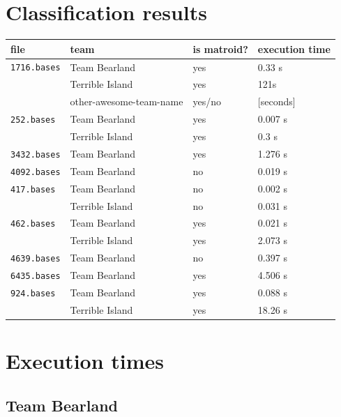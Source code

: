 \documentclass[11pt]{amsart}
\begin{document}
\section{Classification results}

\begin{center}
  \begin{tabular}[c]{llll}
    file
    & team
    & is matroid?
    & execution time
    \\\hline
    \texttt{1716.bases}
    & Team Bearland
    & yes
    & 0.33 s
    \\
    & Terrible Island
    & yes
    & 121s
    \\
    & other-awesome-team-name
    & yes/no
    & [seconds]
    \\\hline
      \texttt{252.bases}
    & Team Bearland
    & yes
    & 0.007 s
    \\
    & Terrible Island
    & yes
    & 0.3 s
    \\\hline
      \texttt{3432.bases}
    & Team Bearland
    & yes
    & 1.276 s
    \\\hline
      \texttt{4092.bases}
    & Team Bearland
    & no
    & 0.019 s
    \\\hline
      \texttt{417.bases}
    & Team Bearland
    & no
    & 0.002 s
    \\
    & Terrible Island
    & no
    & 0.031 s
    \\\hline
      \texttt{462.bases}
    & Team Bearland
    & yes
    & 0.021 s
    \\
    & Terrible Island
    & yes
    & 2.073 s
    \\\hline
      \texttt{4639.bases}
    & Team Bearland
    & no
    & 0.397 s
    \\\hline
    \texttt{6435.bases}
    & Team Bearland
    & yes
    & 4.506 s
    \\\hline
    \texttt{924.bases}
    & Team Bearland
    & yes
    & 0.088 s
    \\
    & Terrible Island
    & yes
    & 18.26 s
    \\\hline
  \end{tabular}
\end{center}

\section{Execution times}

\subsection{Team Bearland}
\end{document}

